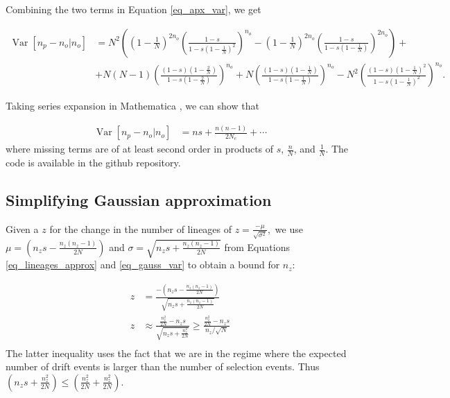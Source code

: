 \documentclass[review,nonatbib]{elsarticle}
\begin{document}
Combining the two terms in Equation \eqref{eq_apx_var}, we get

\newcommand{\vara}[1]{\left(1-\frac{#1}{N}\right)}
\newcommand{\varb}[1]{\left(\frac{1-s}{1-s #1}\right)}

\begin{equation}
  \begin{aligned}
    \operatorname{Var}[n_p-n_o | n_o] &=
    N^2\left( \vara{1}^{2n_o}\varb{\vara{1}^2}^{n_o}-\vara{1}^{2n_o}\varb{\vara{1}}^{2n_o} \right) + \\
    &+ N (N-1) \left( \frac{ (1-s)\left( 1-\frac{2}{N} \right) }{ 1-s\left( 1-\frac{2}{N} \right) } \right)^{n_o} + N \left( \frac{(1-s)\left( 1-\frac{1}{N} \right)}{1-s\left( 1-\frac{1}{N} \right)}\right)^{n_o} - N^2 \left( \frac{(1-s)\left( 1-\frac{1}{N} \right)^2}{1-s\left( 1-\frac{1}{N} \right)^2}\right)^{n_o}.
    \label{eq_exact_var}
  \end{aligned}
\end{equation}

Taking series expansion in Mathematica \citep{Mathematica}, we can show that

\begin{equation}
  \begin{aligned}
    \operatorname{Var}[n_p-n_o | n_o] &= n s + \frac{n (n-1)}{2 N_e}  + \cdots
    \label{eq_exact_var}
  \end{aligned}
\end{equation}
where missing terms are of at least second order in products of  $s$, $\frac{n}{N}$,  and
$\frac{1}{N}.$ The code is available in the github repository.

\subsection{Simplifying Gaussian approximation}
\label{subsec_apx_gauss}
Given a $z$ for the change in the number of lineages of $ z = \frac{-\mu}{\sqrt{\sigma^2}},$
we use $\mu=\left(  n_zs - \frac{n_z(n_z-1)}{2N} \right)$ and $\sigma = \sqrt{n_zs +
\frac{n_z(n_z-1)}{2N}}$ from Equations \ref{eq_lineages_approx} and \ref{eq_gauss_var} to obtain a bound for $n_z$:


\begin{equation}
\begin{aligned}
  z &= \frac{-\left(  n_zs - \frac{n_z(n_z-1)}{2N} \right)}	{\sqrt{n_zs + \frac{n_z(n_z-1)}{2N}}} \\
  z &\approx \frac{\frac{n_z^2}{2N} - n_z s}	{\sqrt{n_zs + \frac{n_z^2}{2N}}} \geq \frac{\frac{n_z^2}{2N} - n_z s}{n_z / \sqrt{N}} \\
 \end{aligned}
\end{equation}
 The latter inequality uses the fact that we are in the regime where the expected number of drift events is larger than the number of
 selection events. Thus $\left(n_zs +
\frac{n_z^2}{2N} \right) \leq \left(\frac{n_z^2}{2N} + \frac{n_z^2}{2N} \right)$.
\end{document}
